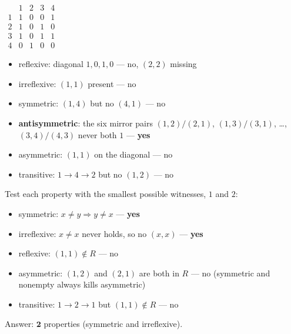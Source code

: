 \documentclass{fkt-notes}
\theoremstyle{definition}
\begin{document}
\begin{example}[$R = \{(1,1), (1,4), (2,1), (2,3), (3,1), (3,3), (3,4), (4,2)\}$ on $\{1, 2, 3, 4\}$: which is true?]
  \leavevmode\par\noindent
  \begin{minipage}[c]{0.28\textwidth}
    \centering
    $\begin{array}{c|cccc}
          & 1 & 2 & 3 & 4 \\ \hline
        1 & 1 & 0 & 0 & 1 \\
        2 & 1 & 0 & 1 & 0 \\
        3 & 1 & 0 & 1 & 1 \\
        4 & 0 & 1 & 0 & 0
      \end{array}$
  \end{minipage}\hfill
  \begin{minipage}[c]{0.7\textwidth}
    \begin{itemize}[nosep]
      \item reflexive: diagonal $1, 0, 1, 0$ --- no, $(2,2)$ missing
      \item irreflexive: $(1,1)$ present --- no
      \item symmetric: $(1,4)$ but no $(4,1)$ --- no
      \item \textbf{antisymmetric}: the six mirror pairs
            $(1,2)/(2,1)$, $(1,3)/(3,1)$, \ldots, $(3,4)/(4,3)$ never
            both $1$ --- \textbf{yes}
      \item asymmetric: $(1,1)$ on the diagonal --- no
      \item transitive: $1 \to 4 \to 2$ but no $(1,2)$ --- no
    \end{itemize}
  \end{minipage}
\end{example}

\begin{example}
  Test each property with the smallest possible witnesses, $1$ and $2$:
  \begin{itemize}[nosep]
    \item symmetric: $x \ne y \Rightarrow y \ne x$ --- \textbf{yes}
    \item irreflexive: $x \ne x$ never holds, so no $(x,x)$ --- \textbf{yes}
    \item reflexive: $(1,1) \notin R$ --- no
    \item asymmetric: $(1,2)$ and $(2,1)$ are both in $R$ --- no
          (symmetric and nonempty always kills asymmetric)
    \item transitive: $1 \to 2 \to 1$ but $(1,1) \notin R$ --- no
  \end{itemize}
  Answer: $\mathbf{2}$ properties (symmetric and irreflexive).
\end{example}
\end{document}
